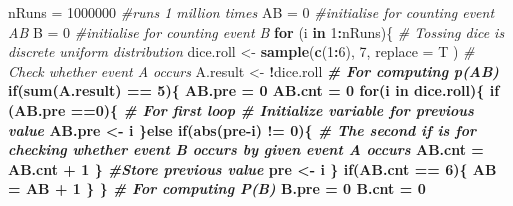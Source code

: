 \documentclass[]{article}
\newenvironment{Shaded}{\begin{snugshade}}{\end{snugshade}}
\newcommand{\KeywordTok}[1]{\textcolor[rgb]{0.13,0.29,0.53}{\textbf{#1}}}
\newcommand{\DataTypeTok}[1]{\textcolor[rgb]{0.13,0.29,0.53}{#1}}
\newcommand{\DecValTok}[1]{\textcolor[rgb]{0.00,0.00,0.81}{#1}}
\newcommand{\StringTok}[1]{\textcolor[rgb]{0.31,0.60,0.02}{#1}}
\newcommand{\CommentTok}[1]{\textcolor[rgb]{0.56,0.35,0.01}{\textit{#1}}}
\newcommand{\ControlFlowTok}[1]{\textcolor[rgb]{0.13,0.29,0.53}{\textbf{#1}}}
\newcommand{\OperatorTok}[1]{\textcolor[rgb]{0.81,0.36,0.00}{\textbf{#1}}}
\newcommand{\NormalTok}[1]{#1}
\begin{document}
\begin{Shaded}
\begin{Highlighting}[]
\NormalTok{nRuns =}\StringTok{ }\DecValTok{1000000} \CommentTok{#runs 1 million times}
\NormalTok{AB =}\StringTok{ }\DecValTok{0} \CommentTok{#initialise for counting event AB}
\NormalTok{B =}\StringTok{ }\DecValTok{0} \CommentTok{#initialise for counting event B}
\ControlFlowTok{for}\NormalTok{ (i }\ControlFlowTok{in} \DecValTok{1}\OperatorTok{:}\NormalTok{nRuns)\{}
    \CommentTok{# Tossing dice is discrete uniform distribution}
\NormalTok{    dice.roll <-}\StringTok{ }\KeywordTok{sample}\NormalTok{(}\KeywordTok{c}\NormalTok{(}\DecValTok{1}\OperatorTok{:}\DecValTok{6}\NormalTok{), }\DecValTok{7}\NormalTok{, }\DataTypeTok{replace =}\NormalTok{ T )}
    \CommentTok{# Check whether event A occurs}
\NormalTok{    A.result <-}\StringTok{ }\OperatorTok{!}\NormalTok{dice.roll }\OperatorTok{%in%}\StringTok{ }\NormalTok{dice.roll[}\KeywordTok{duplicated}\NormalTok{(dice.roll)]}
    \CommentTok{# For computing p(AB)}
    \ControlFlowTok{if}\NormalTok{(}\KeywordTok{sum}\NormalTok{(A.result) }\OperatorTok{==}\StringTok{ }\DecValTok{5}\NormalTok{)\{}
\NormalTok{        AB.pre =}\StringTok{ }\DecValTok{0}
\NormalTok{        AB.cnt =}\StringTok{ }\DecValTok{0}
        \ControlFlowTok{for}\NormalTok{(i }\ControlFlowTok{in}\NormalTok{ dice.roll)\{}
            \ControlFlowTok{if}\NormalTok{ (AB.pre }\OperatorTok{==}\DecValTok{0}\NormalTok{)\{}
                \CommentTok{# For first loop}
                \CommentTok{# Initialize variable for previous value}
\NormalTok{                AB.pre <-}\StringTok{ }\NormalTok{i }
\NormalTok{            \}}\ControlFlowTok{else} \ControlFlowTok{if}\NormalTok{(}\KeywordTok{abs}\NormalTok{(pre}\OperatorTok{-}\NormalTok{i) }\OperatorTok{!=}\StringTok{ }\DecValTok{0}\NormalTok{)\{}
                \CommentTok{# The second if is for checking whether event B occurs by given event A occurs}
\NormalTok{                AB.cnt =}\StringTok{ }\NormalTok{AB.cnt }\OperatorTok{+}\StringTok{ }\DecValTok{1}
\NormalTok{            \}}
            \CommentTok{#Store previous value}
\NormalTok{            pre <-}\StringTok{ }\NormalTok{i}
\NormalTok{        \}}
        \ControlFlowTok{if}\NormalTok{(AB.cnt }\OperatorTok{==}\StringTok{ }\DecValTok{6}\NormalTok{)\{}
\NormalTok{            AB =}\StringTok{ }\NormalTok{AB }\OperatorTok{+}\StringTok{ }\DecValTok{1}
\NormalTok{        \}}
\NormalTok{    \}}
    \CommentTok{# For computing P(B)}
\NormalTok{    B.pre =}\StringTok{ }\DecValTok{0} 
\NormalTok{    B.cnt =}\StringTok{ }\DecValTok{0}
}
\end{Highlighting}
\end{Shaded}
\end{document}
